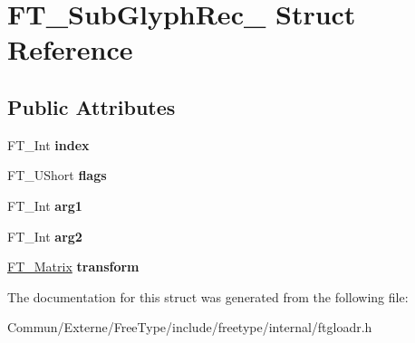 \hypertarget{struct_f_t___sub_glyph_rec__}{}\section{F\+T\+\_\+\+Sub\+Glyph\+Rec\+\_\+ Struct Reference}
\label{struct_f_t___sub_glyph_rec__}
\subsection*{Public Attributes}
\begin{DoxyCompactItemize}
\item 
F\+T\+\_\+\+Int {\bfseries index}\hypertarget{struct_f_t___sub_glyph_rec___aa4febc2d867ff074ac116b068f372d3a}{}\label{struct_f_t___sub_glyph_rec___aa4febc2d867ff074ac116b068f372d3a}

\item 
F\+T\+\_\+\+U\+Short {\bfseries flags}\hypertarget{struct_f_t___sub_glyph_rec___a2d02aefc16061f7e039f76074518f6e5}{}\label{struct_f_t___sub_glyph_rec___a2d02aefc16061f7e039f76074518f6e5}

\item 
F\+T\+\_\+\+Int {\bfseries arg1}\hypertarget{struct_f_t___sub_glyph_rec___ad9f6b04ef50e1b39db90331e76f38206}{}\label{struct_f_t___sub_glyph_rec___ad9f6b04ef50e1b39db90331e76f38206}

\item 
F\+T\+\_\+\+Int {\bfseries arg2}\hypertarget{struct_f_t___sub_glyph_rec___a0d27a8b473379cedeb061f9ecd7e97da}{}\label{struct_f_t___sub_glyph_rec___a0d27a8b473379cedeb061f9ecd7e97da}

\item 
\hyperlink{struct_f_t___matrix__}{F\+T\+\_\+\+Matrix} {\bfseries transform}\hypertarget{struct_f_t___sub_glyph_rec___a3c5fc1959a357c6c2b970ec2118d2683}{}\label{struct_f_t___sub_glyph_rec___a3c5fc1959a357c6c2b970ec2118d2683}

\end{DoxyCompactItemize}


The documentation for this struct was generated from the following file\+:\begin{DoxyCompactItemize}
\item 
Commun/\+Externe/\+Free\+Type/include/freetype/internal/ftgloadr.\+h\end{DoxyCompactItemize}

